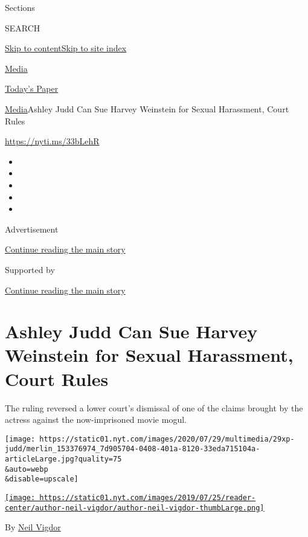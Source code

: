 Sections

SEARCH

\protect\hyperlink{site-content}{Skip to
content}\protect\hyperlink{site-index}{Skip to site index}

\href{https://www.nytimes.com/section/business/media}{Media}

\href{https://myaccount.nytimes.com/auth/login?response_type=cookie\&client_id=vi}{}

\href{https://www.nytimes.com/section/todayspaper}{Today's Paper}

\href{/section/business/media}{Media}\textbar{}Ashley Judd Can Sue
Harvey Weinstein for Sexual Harassment, Court Rules

\url{https://nyti.ms/33bLehR}

\begin{itemize}
\item
\item
\item
\item
\item
\end{itemize}

Advertisement

\protect\hyperlink{after-top}{Continue reading the main story}

Supported by

\protect\hyperlink{after-sponsor}{Continue reading the main story}

\hypertarget{ashley-judd-can-sue-harvey-weinstein-for-sexual-harassment-court-rules}{%
\section{Ashley Judd Can Sue Harvey Weinstein for Sexual Harassment,
Court
Rules}\label{ashley-judd-can-sue-harvey-weinstein-for-sexual-harassment-court-rules}}

The ruling reversed a lower court's dismissal of one of the claims
brought by the actress against the now-imprisoned movie mogul.

\texttt{[image: https://static01.nyt.com/images/2020/07/29/multimedia/29xp-judd/merlin\_153376974\_7d905704-0408-401a-8120-33eda715104a-articleLarge.jpg?quality=75\\\&auto=webp\\\&disable=upscale]}

\href{https://www.nytimes.com/by/neil-vigdor}{\texttt{[image: https://static01.nyt.com/images/2019/07/25/reader-center/author-neil-vigdor/author-neil-vigdor-thumbLarge.png]}}

By \href{https://www.nytimes.com/by/neil-vigdor}{Neil Vigdor}

